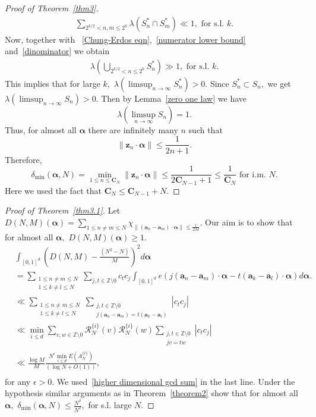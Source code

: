 \documentclass[12pt,article]{amsart}
\theoremstyle{remark}
\numberwithin{equation}{section}
\newcommand{\Z}{\mathbb{Z}}
\newcommand{\boldz}{\boldsymbol{z}}
\newcommand{\bolda}{\boldsymbol{a}}
\newcommand{\boldCN}{\boldsymbol{C}_N}
\newcommand{\boldC}{\boldsymbol{C}}
\newcommand{\boldalpha}{\boldsymbol{\alpha}}
\begin{document}
\begin{proof}[Proof of Theorem~\ref{thm3}]
		\begin{align}\label{dinominator}
			\sum_{2^{k/2}<n,m\leq 2^k}\lambda(S^*_n\cap S^*_m)\ll 1, \text{ for s.l. }k.
		\end{align}
		Now, together with ~\eqref{Chung-Erdos eqn},~\eqref{numerator lower bound} and~\eqref{dinominator} we obtain
		\begin{align*} %
			\lambda\left(\bigcup_{2^{k/2}<n\leq 2^k}S^{*}_n\right)\gg 1, \text{ for s.l. }k.
		\end{align*}
		This implies that for large $k,$ $\lambda(\limsup_{n\to \infty} S^*_n)>0.$ Since $S^*_n\subset S_n,$ we get $\lambda(\limsup_{n\to \infty} S_n)>0.$ Then by Lemma~\ref{zero one law} we  have
		\[\lambda(\limsup_{n\to \infty} S_n)=1.\]
		Thus, for almost all $\boldalpha$ there are infinitely many $n$ such that
		\[\|\boldz_n\cdot\boldalpha\|\leq\frac{1}{2n+1}.\]
		Therefore,
		\[\delta_{\text{min}}(\boldalpha,N)=\min_{1\leq n\leq\boldCN}\|\boldz_n\cdot\boldalpha\|\leq\frac{1}{2\boldC_{N-1}+1}\leq\frac{1}{\boldCN}\text{ for i.m. } N.\]
		Here we used the fact that $\boldCN\leq \boldC_{N-1}+N.$
	\end{proof}
	
	\begin{proof}[Proof of Theorem~\ref{thm3.1}]
		Let $D(N,M)(\boldalpha)=\sum_{1\leq n\neq m\leq N}\chi_{\|(\bolda_n-\bolda_m)\cdot \boldalpha\|\leq\frac{1}{2M}}.$ 
		Our aim is to show that for almost all $\boldalpha,$ $D(N,M)(\boldalpha)\geq 1.$
		\begin{align*}
			&\int_{[0,1]^d}\left(D(N,M)-\frac{(N^2-N)}{M}\right)^2d\boldalpha\\
			&=\sum_{\substack{1\leq n\neq m\leq N\\1\leq k\neq l\leq N}}\sum_{j,t\in\Z\setminus 0}c_tc_j\int_{[0,1]^d}e(j(\bolda_n-\bolda_m)\cdot\boldalpha-t(\bolda_k-\bolda_l)\cdot\boldalpha)d\boldalpha.\\
			&\ll\sum_{\substack{1\leq n\neq m\leq N\\1\leq k\neq l\leq N}}\sum_{\substack{j,t\in\Z\setminus 0\\j(\bolda_n-\bolda_m)=t(\bolda_k-\bolda_l)}}|c_tc_j|\\
			&\ll \min_{i\leq d}\sum_{v,w\in\Z\setminus 0}\mathcal{R}_N^{\{i\}}(v)\mathcal{R}_N^{\{i\}}(w)\sum_{\substack{j,t\in\Z\setminus 0\\jv=tw}}|c_tc_j|\\
			&\ll \frac{\log M }{M}\frac{N^{\epsilon}\min_{i\leq d}E(A_N^{\{i\}})}{(\log N+O(1))},\\
		\end{align*}
		for any $\epsilon>0$. We used~\eqref{higher dimensional gcd sum} in the last line.
		Under the hypothesis similar arguments as in Theorem~\ref{theorem2} show that for almost all $\boldalpha,$ $\delta_{\text{min}}(\boldalpha,N)\leq\frac{N^\delta}{N^2},$ for s.l. large $N.$ 
	\end{proof}
	
\end{document}
